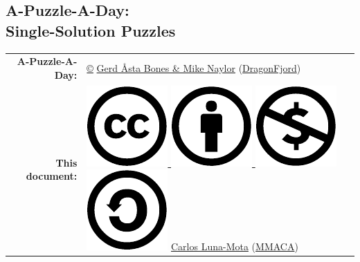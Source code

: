 \documentclass[a4paper, 10pt]{article}
\begin{document}
    \begin{center}
        
        \section*{\Huge A-Puzzle-A-Day:\\Single-Solution Puzzles}
        \bigskip
        
        {\large \begin{tabular}{rl}
         \textbf{A-Puzzle-A-Day:} & \href{https://en.wikipedia.org/wiki/All_rights_reserved}{©} %
            \href{https://www.dragonfjord.com/about-us/}{Gerd Åsta Bones \& Mike Naylor} (\href{https://www.dragonfjord.com/}{DragonFjord}) \\[1ex]
        \textbf{This document:} & \href{https://creativecommons.org/licenses/by-nc-sa/4.0/}{%
            \includegraphics[scale=0.16]{cc.pdf}%
            \includegraphics[scale=0.16]{by.pdf}%
            \includegraphics[scale=0.16]{nc.pdf}%
            \includegraphics[scale=0.16]{sa.pdf}} %
            \href{https://github.com/CarlosLunaMota}{Carlos Luna-Mota} (\href{https://mmaca.cat/}{MMACA})
        \end{tabular}}


\end{center}
\end{document}

